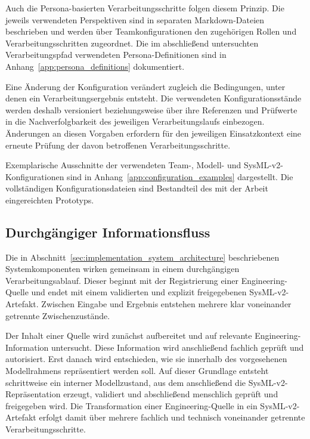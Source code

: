 Auch die Persona-basierten Verarbeitungsschritte folgen diesem Prinzip.
Die jeweils verwendeten Perspektiven sind in separaten Markdown-Dateien
beschrieben und werden über Teamkonfigurationen den zugehörigen Rollen und
Verarbeitungsschritten zugeordnet. Die im abschließend untersuchten
Verarbeitungspfad verwendeten Persona-Definitionen sind in
Anhang~\ref{app:persona_definitions} dokumentiert.

Eine Änderung der Konfiguration verändert zugleich die Bedingungen, unter
denen ein Verarbeitungsergebnis entsteht. Die verwendeten
Konfigurationsstände werden deshalb versioniert beziehungsweise über ihre
Referenzen und Prüfwerte in die Nachverfolgbarkeit des jeweiligen
Verarbeitungslaufs einbezogen. Änderungen an diesen Vorgaben erfordern für
den jeweiligen Einsatzkontext eine erneute Prüfung der davon betroffenen
Verarbeitungsschritte.

Exemplarische Ausschnitte der verwendeten Team-, Modell- und
SysML-v2-Konfigurationen sind in
Anhang~\ref{app:configuration_examples} dargestellt. Die vollständigen
Konfigurationsdateien sind Bestandteil des mit der Arbeit eingereichten
Prototyps.

\subsection{Durchgängiger Informationsfluss}
\label{sec:implementation_e2e_flow}

Die in Abschnitt~\ref{sec:implementation_system_architecture}
beschriebenen Systemkomponenten wirken gemeinsam in einem durchgängigen
Verarbeitungsablauf. Dieser beginnt mit der Registrierung einer
Engineering-Quelle und endet mit einem validierten und explizit
freigegebenen SysML-v2-Artefakt. Zwischen Eingabe und Ergebnis entstehen
mehrere klar voneinander getrennte Zwischenzustände.

Der Inhalt einer Quelle wird zunächst aufbereitet und auf relevante
Engineering-Information untersucht. Diese Information wird anschließend
fachlich geprüft und autorisiert. Erst danach wird entschieden, wie sie
innerhalb des vorgesehenen Modellrahmens repräsentiert werden soll. Auf
dieser Grundlage entsteht schrittweise ein interner Modellzustand, aus dem
anschließend die SysML-v2-Repräsentation erzeugt, validiert und abschließend
menschlich geprüft und freigegeben wird. Die Transformation einer
Engineering-Quelle in ein SysML-v2-Artefakt erfolgt damit über mehrere
fachlich und technisch voneinander getrennte Verarbeitungsschritte.

